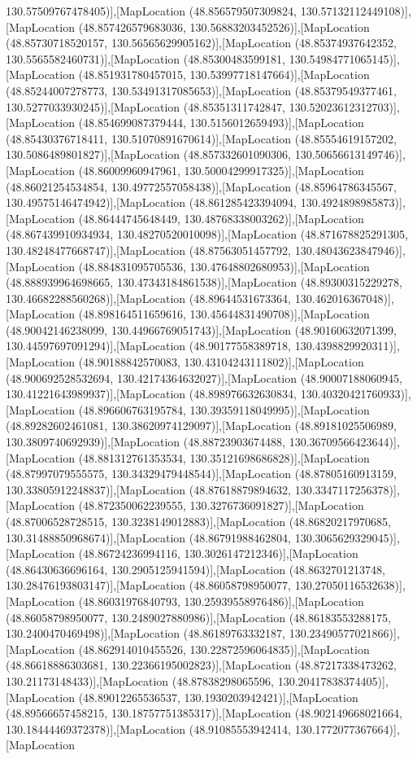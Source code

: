 130.57509767478405)],[MapLocation (48.856579507309824, 130.57132112449108)],[MapLocation (48.857426579683036, 130.56883203452526)],[MapLocation (48.85730718520157, 130.56565629905162)],[MapLocation (48.85374937642352, 130.5565582460731)],[MapLocation (48.85300483599181, 130.54984771065145)],[MapLocation (48.851931780457015, 130.53997718147664)],[MapLocation (48.85244007278773, 130.53491317085653)],[MapLocation (48.85379549377461, 130.5277033930245)],[MapLocation (48.85351311742847, 130.52023612312703)],[MapLocation (48.854699087379444, 130.5156012659493)],[MapLocation (48.85430376718411, 130.51070891670614)],[MapLocation (48.85554619157202, 130.5086489801827)],[MapLocation (48.857332601090306, 130.50656613149746)],[MapLocation (48.86009960947961, 130.50004299917325)],[MapLocation (48.86021254534854, 130.49772557058438)],[MapLocation (48.85964786345567, 130.49575146474942)],[MapLocation (48.861285423394094, 130.4924898985873)],[MapLocation (48.86444745648449, 130.48768338003262)],[MapLocation (48.867439910934934, 130.48270520010098)],[MapLocation (48.871678825291305, 130.48248477668747)],[MapLocation (48.87563051457792, 130.48043623847946)],[MapLocation (48.884831095705536, 130.47648802680953)],[MapLocation (48.888939964698665, 130.47343184861538)],[MapLocation (48.89300315229278, 130.46682288560268)],[MapLocation (48.89644531673364, 130.462016367048)],[MapLocation (48.898164511659616, 130.45644831490708)],[MapLocation (48.90042146238099, 130.44966769051743)],[MapLocation (48.90160632071399, 130.44597697091294)],[MapLocation (48.90177558389718, 130.4398829920311)],[MapLocation (48.90188842570083, 130.43104243111802)],[MapLocation (48.900692528532694, 130.42174364632027)],[MapLocation (48.90007188060945, 130.41221643989937)],[MapLocation (48.898976632630834, 130.40320421760933)],[MapLocation (48.896606763195784, 130.39359118049995)],[MapLocation (48.89282602461081, 130.38620974129097)],[MapLocation (48.89181025506989, 130.3809740692939)],[MapLocation (48.88723903674488, 130.36709566423644)],[MapLocation (48.881312761353534, 130.35121698686828)],[MapLocation (48.87997079555575, 130.34329479448544)],[MapLocation (48.87805160913159, 130.33805912248837)],[MapLocation (48.87618879894632, 130.3347117256378)],[MapLocation (48.872350062239555, 130.3276736091827)],[MapLocation (48.87006528728515, 130.3238149012883)],[MapLocation (48.86820217970685, 130.31488850968674)],[MapLocation (48.86791988462804, 130.3065629329045)],[MapLocation (48.86724236994116, 130.3026147212346)],[MapLocation (48.86430636696164, 130.2905125941594)],[MapLocation (48.8632701213748, 130.28476193803147)],[MapLocation (48.86058798950077, 130.27050116532638)],[MapLocation (48.86031976840793, 130.25939558976486)],[MapLocation (48.86058798950077, 130.2489027880986)],[MapLocation (48.86183553288175, 130.2400470469498)],[MapLocation (48.86189763332187, 130.23490577021866)],[MapLocation (48.862914010455526, 130.22872596064835)],[MapLocation (48.86618886303681, 130.22366195002823)],[MapLocation (48.87217338473262, 130.21173148433)],[MapLocation (48.87838298065596, 130.20417838374405)],[MapLocation (48.89012265536537, 130.1930203942421)],[MapLocation (48.89566657458215, 130.18757751385317)],[MapLocation (48.902149668021664, 130.18444469372378)],[MapLocation (48.91085553942414, 130.1772077367664)],[MapLocation 